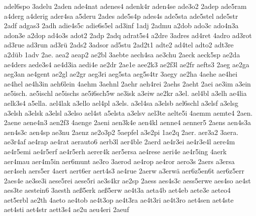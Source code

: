 {    adel6spo
    3adelu
    2aden
    ade4nat
    adenes4
    adenk4r
    aden4se
    ade3o2
    2adep
    ade5ram
    a4derg
    a4derig
    ader4sa
    a5deru
    2ades
    ade5s4p
    ades4s
    ade5sta
    ade5stel
    ade5str
    2adf
    adgas3
    2adh
    adie4s5c
    adie6s5el
    ad3inf
    1adj
    2admu
    a2dob
    ado3c
    ado4n3a
    adon3e
    a2dop
    ad4o3s
    adot2
    2adp
    2adq
    adrat5s4
    a2dre
    3adres
    ad4ret
    4adro
    ad3rot
    ad3rue
    ad3run
    ad3rü
    2ads2
    3adsor
    ad5stu
    2ad2t1
    adte2
    ad4tel
    adto2
    adt3re
    a2düb
    1adv
    2ae.
    aea2
    aeap2
    ae2bl
    3aebte
    aech4sa
    ae3chu
    2aeck
    aeck5sp
    ae2da
    ae4ders
    aede3s4
    ae4d3ia
    aedi4e
    ae2dr
    2ae1e
    aee2k3
    ae2f3l
    ae2fr
    aefts3
    2aeg
    ae2ga
    aeg3an
    ae4gent
    ae2gl
    ae2gr
    aeg3ri
    aeg5sta
    aeg5s4tr
    3aegy
    ae2ha
    4aehe
    ae4hei
    ae4hel
    ae4h3in
    aeh6lein
    4aehm
    3aehnl
    2aehr
    aeh4rei
    2aehs
    2aeht
    2aei
    ae3im
    a3ein
    ae5isch.
    ae5ischl
    ae5ischs
    ae5i6sch5w
    ae3isk
    a3eiw
    ae2kr
    a3el.
    ael4bl
    a3elh
    ae4lia
    aelk3s4
    a5ella.
    ael4lak
    a3ello
    ael4pl
    a3els.
    a3el4sa
    a3elsb
    ael6schl
    a3elsf
    a3elsg
    a3elsh
    a3elsk
    a3elsl
    a3elso
    ael4st
    a5elsta
    a3elsv
    ael3te
    aelte5i
    4aemm
    aemte4
    2aen.
    2aene
    aene4n3
    aen2f3
    4aenge
    2aeni
    aen3k4e
    aen4kl
    aenne4
    aenner5
    2aens
    aen4s3a
    aen4s3c
    aen4sp
    ae3nu
    2aenz
    ae2o3p2
    5aepfel
    a3e2pi
    1ae2q
    2aer.
    aer3a2
    3aera.
    ae3r4af
    ae4rap
    ae4rat
    aerauto6
    aerb3l
    aer4ble
    2aerd
    ae4r3ei
    ae4r3e4l
    aere4m
    ae4r5emi
    ae4r5erf
    ae4r5erh
    aerer4k
    aer5ersa
    ae4rese
    aeri4e
    ae4r5ing
    4aerk
    aer4mau
    aer4m5in
    aer6munt
    ae3ro
    3aerod
    ae4rop
    ae4ror
    aero3s
    2aers
    a3ersa
    aer4seh
    aers5er
    4aert
    aert6er
    aert4s3
    ae4rue
    2aerw
    a3erwä
    aer6z5en6t
    aer6z5err
    2aes4e
    ae3se3i
    aese5rei
    aese5ri
    ae3s4kr
    ae2sp
    2aess
    aes4s3c
    aess5erwe
    aes4so
    ae4st
    aes3te
    aestein6
    3aesth
    aeß5erk
    aeß5erw
    ae4t3a
    aeta4b
    aet4eb
    aete3e
    aeteo4
    aet5erbl
    ae2th
    4aeto
    ae4tob
    ae4t3op
    ae4t3ra
    ae4t3ri
    ae4t3ro
    aet4sen
    aet4ste
    aet4sti
    aet4str
    aett3s4
    ae2u
    aeu4eri
    2aeuf
}
